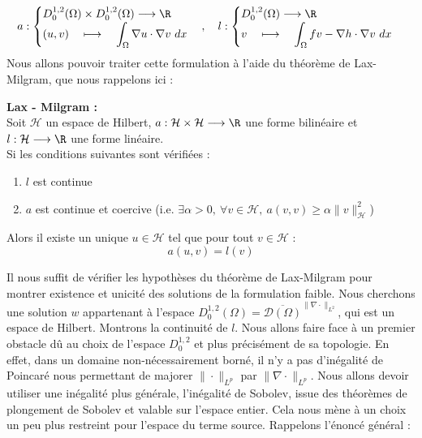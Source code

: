 $$ a : \begin{cases}
    D_0^{1,2}(\Omega) \times D_0^{1,2}(\Omega) \longrightarrow \R \\
    \displaystyle (u,v) \quad \longmapsto \quad \int_{\Omega} \nabla u \cdot \nabla v \ dx
\end{cases}, \quad
l : \begin{cases}
    D^{1,2}_0(\Omega) \longrightarrow \R \\
    \displaystyle v \quad \longmapsto \quad \int_{\Omega} fv - \nabla h \cdot \nabla v \ dx
\end{cases}
$$
Nous allons pouvoir traiter cette formulation à l'aide du théorème de Lax-Milgram, que nous rappelons ici :
\begin{theorembox}
\begin{theorem}
    \textbf{Lax - Milgram :} \\
    Soit $\mathcal{H}$ un espace de Hilbert, $a : \mathcal{H}\times \mathcal{H} \longrightarrow \R$ une forme bilinéaire et $l : \mathcal{H} \longrightarrow \R$ une forme linéaire. \\
    Si les conditions suivantes sont vérifiées :
    \begin{enumerate}
        \item $l$ est continue
        \item $a$ est continue et coercive (i.e. $\exists \alpha > 0, \ \forall v \in \mathcal{H}, \ a(v,v) \geq \alpha \|v\|_{\mathcal{H}}^2$)
    \end{enumerate}
    Alors il existe un unique $u \in \mathcal{H}$ tel que pour tout $v \in \mathcal{H}$ :
    $$ a(u,v) = l(v) $$
\end{theorem}
\end{theorembox}
Il nous suffit de vérifier les hypothèses du théorème de Lax-Milgram pour montrer existence et unicité des solutions de la formulation faible. Nous cherchons une solution $w$ appartenant à l'espace $D^{1,2}_0(\Omega) = \overline{\mathcal{D}(\Omega)}^{\|\nabla \cdot\|_{L^2}}$, qui est un espace de Hilbert.
Montrons la continuité de $l$. Nous allons faire face à un premier obstacle dû au choix de l'espace $D_0^{1,2}$ et plus précisément de sa topologie.
En effet, dans un domaine non-nécessairement borné, il n'y a pas d'inégalité de Poincaré nous permettant de majorer $\|\cdot\|_{L^p}$ par $\|\nabla \cdot\|_{L^p}$. Nous allons devoir utiliser une inégalité plus générale, l'inégalité
de Sobolev, issue des théorèmes de plongement de Sobolev et valable sur l'espace entier. Cela nous mène à un choix un peu plus restreint pour l'espace du terme source. Rappelons l'énoncé général : 
